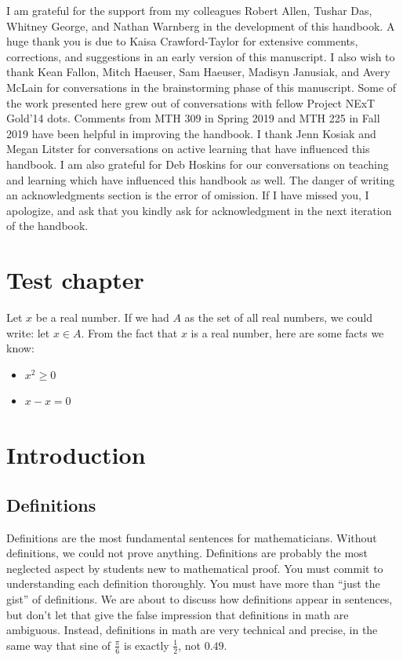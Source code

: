 \documentclass{book}
\theoremstyle{ekimcustom}
\begin{document}
I am grateful for the support from my colleagues Robert Allen, Tushar Das, Whitney George, and Nathan Warnberg in the development of this handbook. A huge thank you is due to Kaisa Crawford-Taylor for extensive comments, corrections, and suggestions in an early version of this manuscript. I also wish to thank Kean Fallon, Mitch Haeuser, Sam Haeuser, Madisyn Janusiak, and Avery McLain for conversations in the brainstorming phase of this manuscript. Some of the work presented here grew out of conversations with fellow Project NExT Gold'14 dots. Comments from MTH 309 in Spring 2019 and MTH 225 in Fall 2019 have been helpful in improving the handbook. I thank Jenn Kosiak and Megan Litster for conversations on active learning that have influenced this handbook. I am also grateful for Deb Hoskins for our conversations on teaching and learning which have influenced this handbook as well. The danger of writing an acknowledgments section is the error of omission. If I have missed you, I apologize, and ask that you kindly ask for acknowledgment in the next iteration of the handbook.


\mainmatter

\chapter{Test chapter}
Let $x$ be a real number. If we had $A$ as the set of all real numbers, we could write: let $x \in A$. From the fact that $x$ is a real number, here are some facts we know:
\begin{itemize}
    \item $x^2 \geq 0$
    \item $x - x = 0$
\end{itemize}

\chapter{Introduction}\label{chapter:introductory}

\section{Definitions}\label{section:definitions}

Definitions are the most fundamental sentences for mathematicians. Without definitions, we could not prove anything. Definitions are probably the most neglected aspect by students new to mathematical proof. You must commit to understanding each definition thoroughly. You must have more than ``just the gist'' of definitions. We are about to discuss how definitions appear in sentences, but don't let that give the false impression that definitions in math are ambiguous. Instead, definitions in math are very technical and precise, in the same way that sine of $\frac\pi6$ is exactly $\frac12$, not $0.49$.
\end{document}
